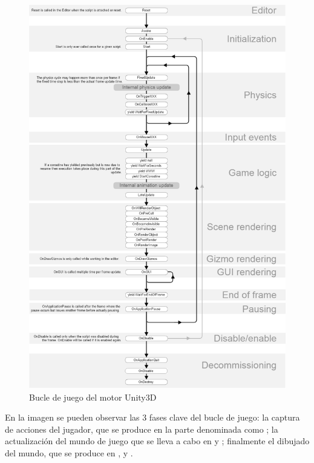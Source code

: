 \begin{figure}[H]
\begin{center}
\includegraphics[scale=0.55]{imagenes/bucleUnity.png}
\caption{Bucle de juego del motor Unity3D}
\label{bucleUnity}
\end{center}
\end{figure}

En la imagen se pueden observar las 3 fases clave del bucle de juego: la captura de acciones del jugador, que se produce en la parte denominada como ; la actualización del mundo de juego que se lleva a cabo en  y ; finalmente el dibujado del mundo, que se produce en ,  y .


